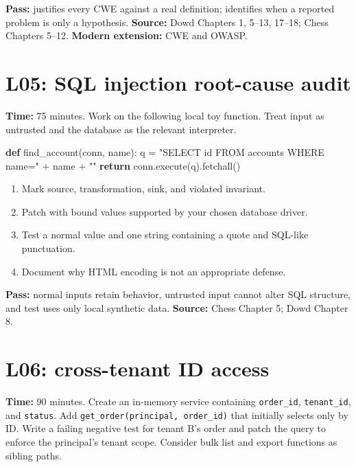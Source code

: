 \documentclass[
  letterpaper,
]{article}
\newenvironment{Shaded}{}{}
\newcommand{\ControlFlowTok}[1]{\textcolor[rgb]{0.00,0.44,0.13}{\textbf{#1}}}
\newcommand{\KeywordTok}[1]{\textcolor[rgb]{0.00,0.44,0.13}{\textbf{#1}}}
\newcommand{\NormalTok}[1]{#1}
\newcommand{\OperatorTok}[1]{\textcolor[rgb]{0.40,0.40,0.40}{#1}}
\newcommand{\StringTok}[1]{\textcolor[rgb]{0.25,0.44,0.63}{#1}}
\providecommand{\tightlist}{%
  \setlength{\itemsep}{0pt}\setlength{\parskip}{0pt}}
\begin{document}
\textbf{Pass:} justifies every CWE against a real definition; identifies
when a reported problem is only a hypothesis. \textbf{Source:} Dowd
Chapters 1, 5--13, 17--18; Chess Chapters 5--12. \textbf{Modern
extension:} CWE and OWASP.

\section{L05: SQL injection root-cause
audit}\label{l05-sql-injection-root-cause-audit}

\textbf{Time:} 75 minutes. Work on the following local toy function.
Treat input as untrusted and the database as the relevant interpreter.

\begin{Shaded}
\begin{Highlighting}[]
\KeywordTok{def}\NormalTok{ find\_account(conn, name):}
\NormalTok{    q }\OperatorTok{=} \StringTok{"SELECT id FROM accounts WHERE name=\textquotesingle{}"} \OperatorTok{+}\NormalTok{ name }\OperatorTok{+} \StringTok{"\textquotesingle{}"}
    \ControlFlowTok{return}\NormalTok{ conn.execute(q).fetchall()}
\end{Highlighting}
\end{Shaded}

\begin{enumerate}
\def\labelenumi{\arabic{enumi}.}
\tightlist
\item
  Mark source, transformation, sink, and violated invariant.
\item
  Patch with bound values supported by your chosen database driver.
\item
  Test a normal value and one string containing a quote and SQL-like
  punctuation.
\item
  Document why HTML encoding is not an appropriate defense.
\end{enumerate}

\textbf{Pass:} normal inputs retain behavior, untrusted input cannot
alter SQL structure, and test uses only local synthetic data.
\textbf{Source:} Chess Chapter 5; Dowd Chapter 8.

\section{L06: cross-tenant ID access}\label{l06-cross-tenant-id-access}

\textbf{Time:} 90 minutes. Create an in-memory service containing
\texttt{order\_id}, \texttt{tenant\_id}, and \texttt{status}. Add
\texttt{get\_order(principal,\ order\_id)} that initially selects only
by ID. Write a failing negative test for tenant B's order and patch the
query to enforce the principal's tenant scope. Consider bulk list and
export functions as sibling paths.
\end{document}
